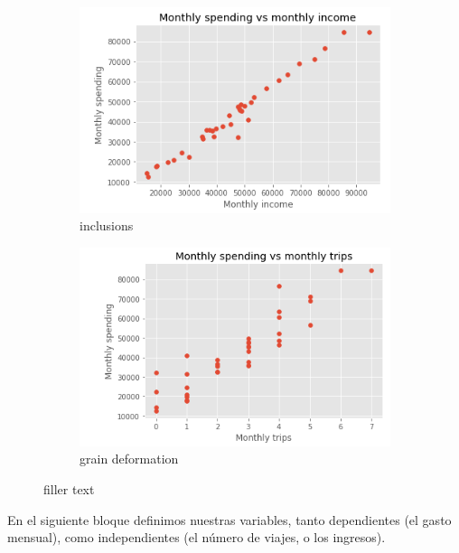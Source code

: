 \begin{figure}[h!]
    \centering
    \begin{subfigure}{0.5\textwidth}
    \centering
        \includegraphics[width=1\linewidth]{img/MspendMinc.png}
        \caption{inclusions}
        \label{fig:inclu}
    \end{subfigure}%
    \begin{subfigure}{0.5\textwidth}
    \centering
        \includegraphics[width=1\linewidth]{img/MspendMtrp.png}
        \caption{grain deformation}
        \label{fig:deform}
    \end{subfigure}
    \caption{filler text}
    \label{fig:manmade}
    \end{figure}
\vspace{0.50cm}

En el siguiente bloque definimos nuestras variables, tanto dependientes (el
gasto mensual), como independientes (el número de viajes, o los ingresos). 

